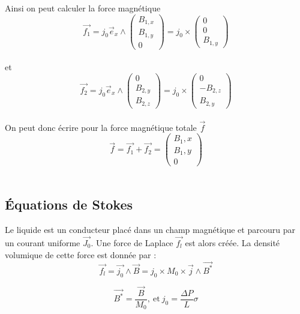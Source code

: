 \documentclass[a4paper,12pt,titlepage]{report}
\begin{document}
\begin{onehalfspace}
Ainsi on peut calculer la force magnétique \\%
\[
	\vec{f_1}=j_0\vec{e}_{x}
	\wedge\begin{pmatrix}
   		B_{1,x}\\
   		B _{1,y}\\
   		0
\end{pmatrix}=
j_0\times \begin{pmatrix}
  			0\\
   			0\\
    		B_{1,y}
			\end{pmatrix} 
\]
\\%
 et 
\[
	\vec{f_2}=j_0\vec{e}_x\wedge\begin{pmatrix}
   					0\\
   					B _{2,y}\\
   					B_{2,z}
					\end{pmatrix}
	=
	j_0\times \begin{pmatrix}
   				0\\
   				-B _{2,z}\\
   				B_{2,y}
		\end{pmatrix} 
\]
\\%

On peut donc écrire pour la force magnétique totale $\vec{f}$
\[
	\vec{f}=\vec{f_1}+\vec{f_2}=\begin{pmatrix}
   B_1,x\\
   B _1,y\\
   0
\end{pmatrix} 
\]
\\%

\subsection{Équations de Stokes}

Le liquide est un conducteur placé dans un champ magnétique et parcouru par un courant uniforme $\vec{J_0}$. Une force de Laplace $\vec{f_l}$ est alors créée. La densité volumique de cette force est donnée par :
\[
	\vec{f_l}=\vec{j_0}\land\vec{B}=j_0\times M_0\times \vec{j}\wedge \vec{B^*}
\]

\[
	 \vec{B^*} =\frac{\vec{B}}{M_0}, 
	\ \text{et} \ j_0=\frac{\Delta P}{L}\sigma
\]


\end{onehalfspace}
\end{document}
